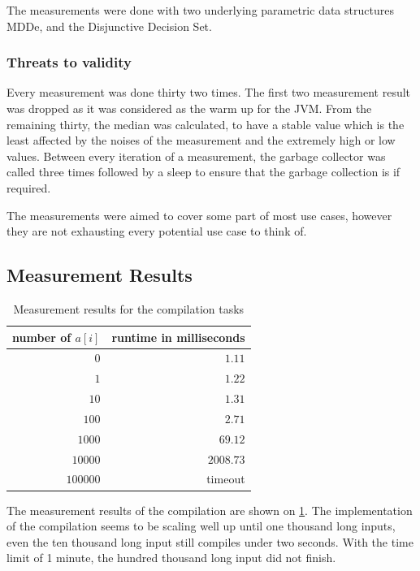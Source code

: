 	The measurements were done with two underlying parametric data structures MDDe, and the  Disjunctive Decision Set.
	
	
		\subsubsection{Threats to validity}
		Every measurement was done thirty two times. The first two measurement result was dropped as it was considered as the warm up for the JVM. From the remaining thirty, the median was calculated, to have a stable value which is the least affected by the noises of the measurement and the extremely high or low values. Between every iteration of a measurement, the garbage collector was called three times followed by a sleep to ensure that the garbage collection is if required.
		
		The measurements were aimed to cover some part of most use cases, however they are not exhausting every potential use case to think of.
		
		
	
	\subsection{Measurement Results}
		\begin{table}
			\centering
			\caption{Measurement results for the compilation tasks}		
			\label{tab:cep:meascompile}
			\begin{tabular}{rr}
				\toprule
				number of $a[i]$ & runtime in milliseconds \\ \midrule
				             $0$ &                  $1.11$ \\
				             $1$ &                  $1.22$ \\
				            $10$ &                  $1.31$ \\
				           $100$ &                  $2.71$ \\
				          $1000$ &                 $69.12$ \\
				         $10000$ &               $2008.73$ \\
				        $100000$ &                 timeout \\ \bottomrule
			\end{tabular}
		\end{table}
		The measurement results of the compilation are shown on \cref{tab:cep:meascompile}.
		The implementation of the compilation seems to be scaling well up until one thousand long inputs, even the ten thousand long input still compiles under two seconds. With the time limit of 1 minute, the hundred thousand long input did not finish.
		
